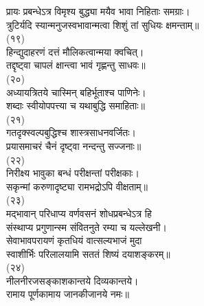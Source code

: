\begin{center}
प्रायः प्रबन्धेऽत्र विमृश्य बुद्ध्या मयैव भावा निहिताः समग्राः।\nopagebreak\\
त्रुटिर्यदि स्यान्मनुजस्वभावान्मत्वा शिशुं तां सुधियः क्षमन्ताम्॥\\
(१९)\nopagebreak\\
हिन्द्युदाहरणं दत्तं मौलिकत्वान्मया क्वचित्।\nopagebreak\\
तद्दृष्ट्वा चापलं क्षान्त्वा भावं गृह्णन्तु साधवः॥\\
(२०)\nopagebreak\\
अध्यायत्रितये चास्मिन् बहिर्भूताश्च पाणिनेः।\nopagebreak\\
शब्दाः स्वीयोपपत्त्या च यथाबुद्धि समाहिताः॥\\
(२१)\nopagebreak\\
गतदृक्स्वल्पबुद्धिश्च शास्त्रसाधनवर्जितः।\nopagebreak\\
प्रयासमाचरं चैनं दृष्ट्वा नन्दन्तु सज्जनाः॥\\
(२२)\nopagebreak\\
निरीक्ष्य भावुका बन्धं परीक्षन्तां परीक्षकाः।\nopagebreak\\
सकृन्मां करुणादृष्ट्या रामभद्रोऽपि वीक्षताम्॥\\
(२३)\nopagebreak\\
मद्भावान् परिधाप्य वर्णवसनं शोधप्रबन्धेऽत्र हि\nopagebreak\\
संस्थाप्य प्रगुणान्स्म संवितनुते रम्या च यल्लेखनी।\nopagebreak\\
सेवाभावपरायणं कृतधियं वात्सल्यभाजं मुदा\nopagebreak\\
स्वाशीर्भिः परिलालयामि सततं शिष्यं दयाशङ्करम्॥\\
(२४)\nopagebreak\\
नीलनीरजसङ्काशकान्तये दिव्यकान्तये।\nopagebreak\\
रामाय पूर्णकामाय जानकीजानये नमः॥\\
\end{center}

